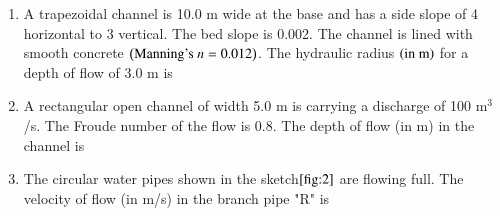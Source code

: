 \documentclass[journal]{IEEEtran}
\numberwithin{equation}{enumi}
\numberwithin{figure}{enumi}
\begin{document}
\begin{enumerate}
\begin{enumerate}
\end{enumerate}

\item A trapezoidal channel is 10.0 m wide at the base and has a side slope of 4 horizontal to 3 vertical. The bed slope is 0.002. The channel is lined with smooth concrete $\left(\text{Manning's } n=0.012\right)$. The hydraulic radius $\left(\text{in m}\right)$ for a depth of flow of 3.0 m is

\begin{enumerate}
\end{enumerate}

\item A rectangular open channel of width 5.0 m is carrying a discharge of 100 m$^3$/s. The Froude number of the flow is 0.8. The depth of flow (in m) in the channel is

\begin{enumerate}
\end{enumerate}
\item The circular water pipes shown in the sketch$\ref{fig:2}$ are flowing full. The velocity of flow (in m/s) in the branch pipe "R" is
\begin{figure}[H]
    \centering
    
    \caption{}
    \label{fig:2}
\end{figure}

\begin{enumerate}
\end{enumerate}


\end{enumerate}
\end{document}
